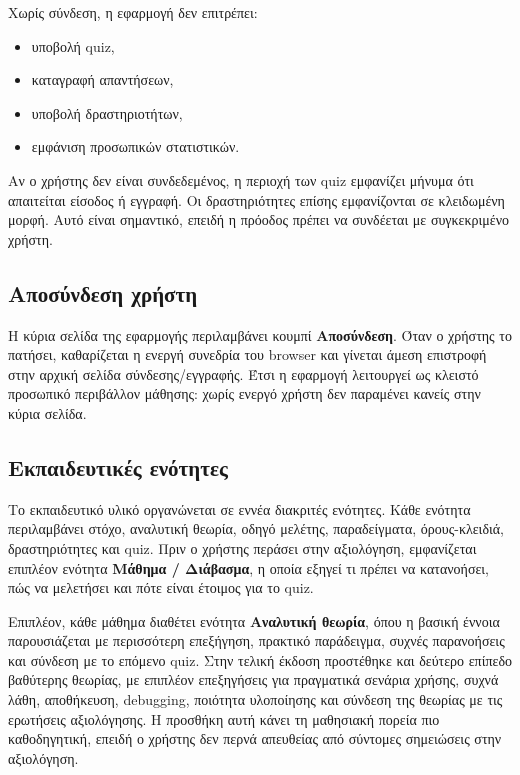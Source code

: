 \documentclass[12pt,a4paper]{article}
\begin{document}
Χωρίς σύνδεση, η εφαρμογή δεν επιτρέπει:

\begin{itemize}[leftmargin=1.2cm]
  \item υποβολή quiz,
  \item καταγραφή απαντήσεων,
  \item υποβολή δραστηριοτήτων,
  \item εμφάνιση προσωπικών στατιστικών.
\end{itemize}

Αν ο χρήστης δεν είναι συνδεδεμένος, η περιοχή των quiz εμφανίζει μήνυμα ότι απαιτείται είσοδος ή εγγραφή. Οι δραστηριότητες επίσης εμφανίζονται σε κλειδωμένη μορφή. Αυτό είναι σημαντικό, επειδή η πρόοδος πρέπει να συνδέεται με συγκεκριμένο χρήστη.

\subsection{Αποσύνδεση χρήστη}

Η κύρια σελίδα της εφαρμογής περιλαμβάνει κουμπί \textbf{Αποσύνδεση}. Όταν ο χρήστης το πατήσει, καθαρίζεται η ενεργή συνεδρία του browser και γίνεται άμεση επιστροφή στην αρχική σελίδα σύνδεσης/εγγραφής. Έτσι η εφαρμογή λειτουργεί ως κλειστό προσωπικό περιβάλλον μάθησης: χωρίς ενεργό χρήστη δεν παραμένει κανείς στην κύρια σελίδα.

\subsection{Εκπαιδευτικές ενότητες}

Το εκπαιδευτικό υλικό οργανώνεται σε εννέα διακριτές ενότητες. Κάθε ενότητα περιλαμβάνει στόχο, αναλυτική θεωρία, οδηγό μελέτης, παραδείγματα, όρους-κλειδιά, δραστηριότητες και quiz. Πριν ο χρήστης περάσει στην αξιολόγηση, εμφανίζεται επιπλέον ενότητα \textbf{Μάθημα / Διάβασμα}, η οποία εξηγεί τι πρέπει να κατανοήσει, πώς να μελετήσει και πότε είναι έτοιμος για το quiz.

Επιπλέον, κάθε μάθημα διαθέτει ενότητα \textbf{Αναλυτική θεωρία}, όπου η βασική έννοια παρουσιάζεται με περισσότερη επεξήγηση, πρακτικό παράδειγμα, συχνές παρανοήσεις και σύνδεση με το επόμενο quiz. Στην τελική έκδοση προστέθηκε και δεύτερο επίπεδο βαθύτερης θεωρίας, με επιπλέον επεξηγήσεις για πραγματικά σενάρια χρήσης, συχνά λάθη, αποθήκευση, debugging, ποιότητα υλοποίησης και σύνδεση της θεωρίας με τις ερωτήσεις αξιολόγησης. Η προσθήκη αυτή κάνει τη μαθησιακή πορεία πιο καθοδηγητική, επειδή ο χρήστης δεν περνά απευθείας από σύντομες σημειώσεις στην αξιολόγηση.
\end{document}
